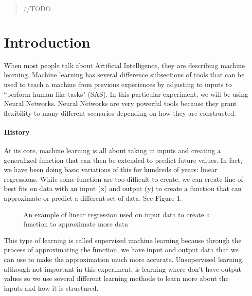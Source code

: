 \documentclass[12pt]{article}
\begin{document}
\maketitle

\begin{abstract}
\color{red} //TODO
\end{abstract}

\section{Introduction}
When most people talk about Artificial Intelligence, they are describing machine learning. Machine learning has several difference subsections of tools that can be used to teach a machine from previous experiences by adjusting to inputs to ``perform human-like tasks" (SAS). In this particular experiment, we will be using Neural Networks. Neural Networks are very powerful tools because they grant flexibility to many different scenarios depending on how they are constructed. 


\paragraph{History}
At its core, machine learning is all about taking in inputs and creating a generalized function that can then be extended to predict future values. In fact, we have been doing basic variations of this for hundreds of years: linear regressions. While some function are too difficult to create, we can create line of best fits on data with an input (x) and output (y) to create a function that can approximate or predict a different set of data. See Figure 1. 

\begin{figure}[H]
    \centering
    \def\svgwidth{\columnwidth}
    
    \caption{An example of linear regression used on input data to create a function to approximate more data}
\end{figure}

This type of learning is called supervised machine learning because through the process of approximating the function, we have input and output data that we can use to make the approximation much more accurate. Unsupervised learning, although not important in this experiment, is learning where don't have output values so we use several different learning methods to learn more about the inputs and how it is structured. \\%
\end{document}
